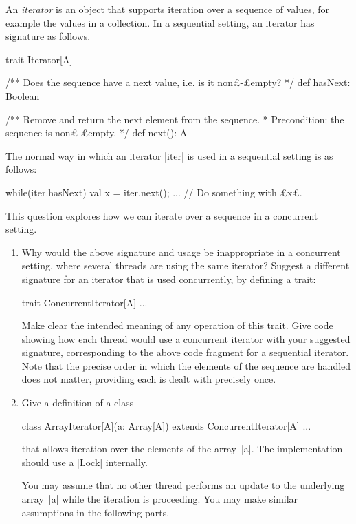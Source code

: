 \begin{question}
An \emph{iterator} is an object that supports iteration over a sequence of
values, for example the values in a collection.  In a sequential setting, an
iterator has signature as follows.
%
\begin{scala}
trait Iterator[A]{
  /** Does the sequence have a next value, i.e. is it non£-£empty? */
  def hasNext: Boolean

  /** Remove and return the next element from the sequence.
    * Precondition: the sequence is non£-£empty. */
  def next(): A
}
\end{scala}
%
The normal way in which an iterator |iter| is used in a sequential setting is
as follows:
%
\begin{scala}
while(iter.hasNext){
  val x = iter.next(); ... // Do something with £x£.
}
\end{scala}
%
This question explores how we can iterate over a sequence in a concurrent
setting.


\begin{enumerate}
\item
Why would the above signature and usage be inappropriate in a concurrent
setting, where several threads are using the same iterator?
%
Suggest a different signature for an iterator that is used concurrently, by
defining a trait:
%
\begin{scala}
trait ConcurrentIterator[A]{ ... }
\end{scala}
Make clear the intended meaning of any operation of this trait.
%
Give code showing how each thread would use a concurrent iterator with your
suggested signature, corresponding to the above code fragment for a sequential
iterator.  Note that the precise order in which the elements of the sequence
are handled does not matter, providing each is dealt with precisely once.


\item
Give a definition of a class
%
\begin{scala}
class ArrayIterator[A](a: Array[A]) extends ConcurrentIterator[A]{ ... }
\end{scala}
%
that allows iteration over the elements of the array~|a|.  The implementation
should use a |Lock| internally.

You may assume that no other thread performs an update to the underlying
array~|a| while the iteration is proceeding.  You may make similar assumptions
in the following parts. 


\end{enumerate}
\end{question}
